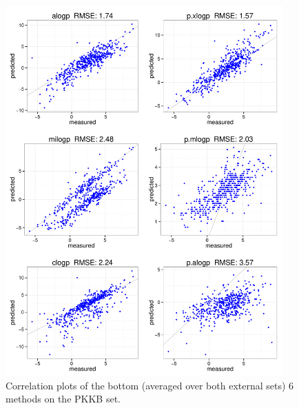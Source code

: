 \documentclass[]{article}
\begin{document}
\begin{figure}[ht]
  \centering
  \includegraphics[width=0.95\textwidth]{./figures_si/pkkb_scatter_2.pdf}
  \caption{Correlation plots of the bottom (averaged over both external sets) 6 methods on the PKKB set.}
  \label{fig:external_comparison4}
\end{figure}
\end{document}
